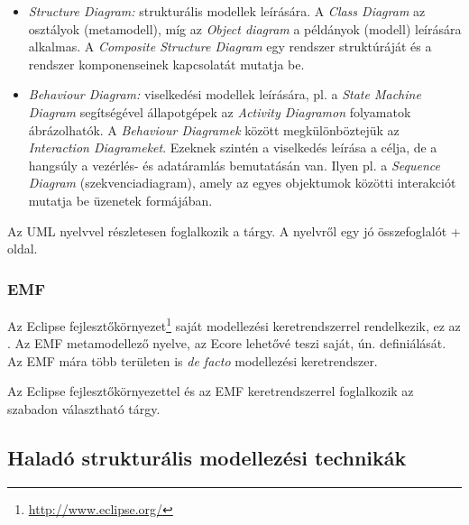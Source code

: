 \begin{itemize}
	\item \emph{Structure Diagram:} strukturális modellek leírására. A \emph{Class Diagram} az osztályok (metamodell), míg az \emph{Object diagram} a példányok (modell) leírására alkalmas. A \emph{Composite Structure Diagram} egy rendszer struktúráját és a rendszer komponenseinek kapcsolatát mutatja be.
	\item \emph{Behaviour Diagram:} viselkedési modellek leírására, pl. a \emph{State Machine Diagram} segítségével állapotgépek az \emph{Activity Diagramon} folyamatok ábrázolhatók. A \emph{Behaviour Diagramek} között megkülönböztejük az \emph{Interaction Diagrameket}. Ezeknek szintén a viselkedés leírása a célja, de a hangsúly a vezérlés- és adatáramlás bemutatásán van. Ilyen pl. a \emph{Sequence Diagram} (szekvenciadiagram), amely az egyes objektumok közötti interakciót mutatja be üzenetek formájában.
\end{itemize}


Az UML nyelvvel részletesen foglalkozik a \szofttech tárgy. A nyelvről egy jó összefoglalót \az+\cite{uml-diagrams} oldal.


\subsubsection{EMF}

Az Eclipse fejlesztőkörnyezet\footnote{\url{http://www.eclipse.org/}} saját modellezési keretrendszerrel rendelkezik, ez az . Az EMF metamodellező nyelve, az Ecore lehetővé teszi saját, ún.  definiálását. Az EMF mára több területen is \emph{de facto} modellezési keretrendszer.

Az Eclipse fejlesztőkörnyezettel és az EMF keretrendszerrel foglalkozik az \eat szabadon választható tárgy.

\subsection{Haladó strukturális modellezési technikák}

